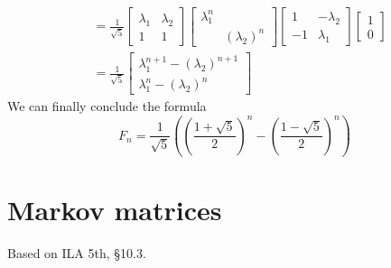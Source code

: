 \documentclass[11pt,oneside]{amsbook}
\theoremstyle{definition}
\theoremstyle{plain}
\theoremstyle{definition}
\theoremstyle{remark}
\numberwithin{equation}{section}
\numberwithin{figure}{section}
\begin{document}
\begin{itemize}
\begin{itemize}
\begin{align*}
        &=\frac{1}{\sqrt{5}}
          \begin{bmatrix}\lambda_1&
            \lambda_2\\1&1\end{bmatrix}
          \begin{bmatrix}\lambda_1^n\\
            &(\lambda_2)^n\end{bmatrix}
          \begin{bmatrix}1&-\lambda_2\\
            -1&\lambda_1\end{bmatrix}
          \begin{bmatrix}1\\0\end{bmatrix}\\
        &=\frac{1}{\sqrt{5}}
          \begin{bmatrix}
            \lambda_1^{n+1}-(\lambda_2)^{n+1}\\
            \lambda_1^n-(\lambda_2)^n
          \end{bmatrix}
      \end{align*}
      We can finally conclude the formula
      \[F_n=\frac{1}{\sqrt{5}}
        \left(\left(\frac{1+\sqrt{5}}{2}\right)^n
        -\left(\frac{1-\sqrt{5}}{2}\right)^n\right)
      \]
    \end{itemize}
\end{itemize}

\newpage
\section{Markov matrices}

Based on ILA 5th, \S 10.3.
\end{document}
